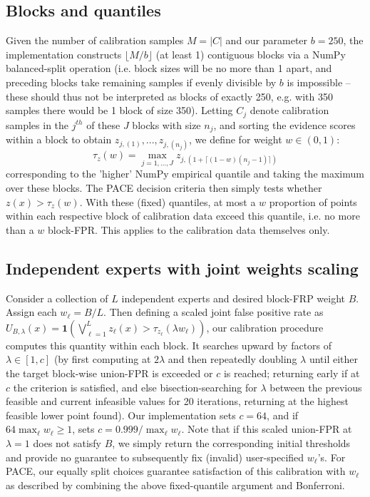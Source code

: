 \subsection{Blocks and quantiles} 
Given the number of calibration samples $M = |C|$ and our parameter $b=250$, the implementation constructs $\lfloor M/b\rfloor$ (at least 1) contiguous blocks via a NumPy balanced-split operation (i.e. block sizes will be no more than 1 apart, and preceding blocks take remaining samples if evenly divisible by $b$ is impossible -- these should thus not be interpreted as blocks of exactly 250, e.g. with 350 samples there would be 1 block of size 350). Letting $C_j$ denote calibration samples in the $j^{th}$ of these $J$ blocks with size $n_j$, and sorting the evidence scores within a block to obtain $z_{j,(1)},...,z_{j,(n_j)}$, we define for weight $w\in (0,1)$:
\begin{equation} 
\tau_z(w) = \max_{j = 1,..., J} z_{j, (1+\lceil(1-w)(n_j-1)\rceil)} 
\label{eq:threshold} 
\end{equation} 
corresponding to the 'higher' NumPy empirical quantile and taking the maximum over these blocks. The PACE decision criteria then simply tests whether $z(x) > \tau_z(w)$. With these (fixed) quantiles, at most a $w$ proportion of points within each respective block of calibration data exceed this quantile, i.e. no more than a $w$ block-FPR. This applies to the calibration data themselves only.

\subsection{Independent experts with joint weights scaling} 
Consider a collection of $L$ independent experts and desired block-FRP weight $B$. Assign each $w_{\ell}= B/L$. Then defining a scaled joint false positive rate as $U_{B, \lambda}(x) = \mathbf{1}(\bigvee_{\ell=1}^L z_{\ell}(x)>\tau_{z_{\ell}}(\lambda w_{\ell}))$, our calibration procedure computes this quantity within each block. It searches upward by factors of $\lambda \in [1,c]$ (by first computing at $2\lambda$ and then repeatedly doubling $\lambda$ until either the target block-wise union-FPR is exceeded or $c$ is reached; returning early if at $c$ the criterion is satisfied, and else bisection-searching for $\lambda$ between the previous feasible and current infeasible values for 20 iterations, returning at the highest feasible lower point found). Our implementation sets $c=64$, and if $64 \max_{\ell} w_{\ell} \ge 1$, sets $c = 0.999/\max_{\ell} w_{\ell}$. Note that if this scaled union-FPR at $\lambda=1$ does not satisfy $B$, we simply return the corresponding initial thresholds and provide no guarantee to subsequently fix (invalid) user-specified $w_\ell$'s. For PACE, our equally split choices guarantee satisfaction of this calibration with $w_\ell$ as described by combining the above fixed-quantile argument and Bonferroni.

